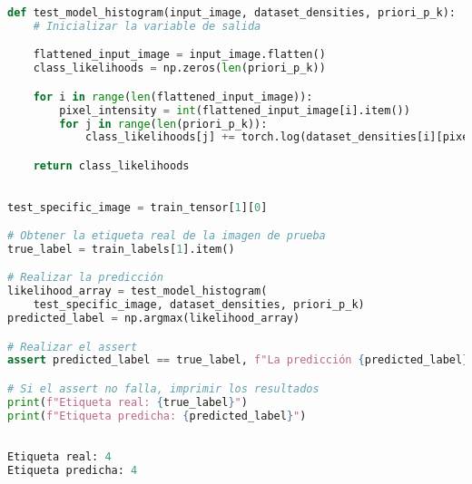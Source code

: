 \documentclass[spanish]{article}
\begin{document}
\begin{enumerate}
\begin{enumerate}
\begin{enumerate}
\begin{enumerate}
\begin{enumerate}
\begin{lstlisting}[language=Python, caption=Implementacion Test Model]
def test_model_histogram(input_image, dataset_densities, priori_p_k):
    # Inicializar la variable de salida

    flattened_input_image = input_image.flatten()
    class_likelihoods = np.zeros(len(priori_p_k))

    for i in range(len(flattened_input_image)):
        pixel_intensity = int(flattened_input_image[i].item())
        for j in range(len(priori_p_k)):
            class_likelihoods[j] += torch.log(dataset_densities[i][pixel_intensity][j]) + torch.log(priori_p_k[j])

    return class_likelihoods

\end{lstlisting}

\begin{lstlisting}[language=Python, caption=Prueba Unitaria]

test_specific_image = train_tensor[1][0]

# Obtener la etiqueta real de la imagen de prueba
true_label = train_labels[1].item()

# Realizar la predicción
likelihood_array = test_model_histogram(
    test_specific_image, dataset_densities, priori_p_k)
predicted_label = np.argmax(likelihood_array)

# Realizar el assert
assert predicted_label == true_label, f"La predicción {predicted_label} no coincide con la etiqueta real {true_label}"

# Si el assert no falla, imprimir los resultados
print(f"Etiqueta real: {true_label}")
print(f"Etiqueta predicha: {predicted_label}")

\end{lstlisting}

\begin{lstlisting}[language=Python, caption=Salida Prueba Unitaria]

Etiqueta real: 4
Etiqueta predicha: 4


\end{lstlisting}


\end{enumerate}
\end{enumerate}
\end{enumerate}
\end{enumerate}
\end{enumerate}
\end{document}

